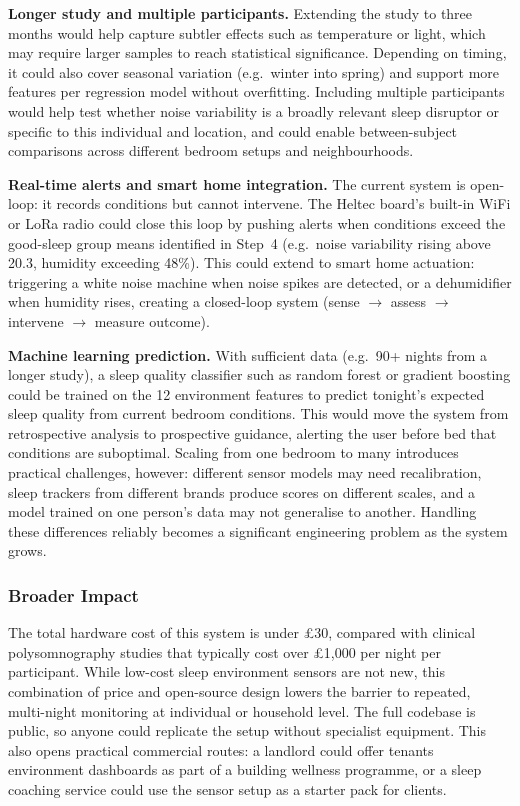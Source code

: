 \documentclass[10pt,a4paper]{extarticle}
\begin{document}
\textbf{Longer study and multiple participants.} Extending the study to three months would help capture subtler effects such as temperature or light, which may require larger samples to reach statistical significance. Depending on timing, it could also cover seasonal variation (e.g.\ winter into spring) and support more features per regression model without overfitting. Including multiple participants would help test whether noise variability is a broadly relevant sleep disruptor or specific to this individual and location, and could enable between-subject comparisons across different bedroom setups and neighbourhoods.

\textbf{Real-time alerts and smart home integration.} The current system is open-loop: it records conditions but cannot intervene. The Heltec board's built-in WiFi or LoRa radio could close this loop by pushing alerts when conditions exceed the good-sleep group means identified in Step~4 (e.g.\ noise variability rising above 20.3, humidity exceeding 48\%). This could extend to smart home actuation: triggering a white noise machine when noise spikes are detected, or a dehumidifier when humidity rises, creating a closed-loop system (sense $\rightarrow$ assess $\rightarrow$ intervene $\rightarrow$ measure outcome).

\textbf{Machine learning prediction.} With sufficient data (e.g.\ 90+ nights from a longer study), a sleep quality classifier such as random forest or gradient boosting could be trained on the 12 environment features to predict tonight's expected sleep quality from current bedroom conditions. This would move the system from retrospective analysis to prospective guidance, alerting the user before bed that conditions are suboptimal. Scaling from one bedroom to many introduces practical challenges, however: different sensor models may need recalibration, sleep trackers from different brands produce scores on different scales, and a model trained on one person's data may not generalise to another. Handling these differences reliably becomes a significant engineering problem as the system grows.

\subsubsection{Broader Impact}

The total hardware cost of this system is under \pounds30, compared with clinical polysomnography studies that typically cost over \pounds1{,}000 per night per participant. While low-cost sleep environment sensors are not new, this combination of price and open-source design lowers the barrier to repeated, multi-night monitoring at individual or household level. The full codebase is public, so anyone could replicate the setup without specialist equipment. This also opens practical commercial routes: a landlord could offer tenants environment dashboards as part of a building wellness programme, or a sleep coaching service could use the sensor setup as a starter pack for clients.
\end{document}
